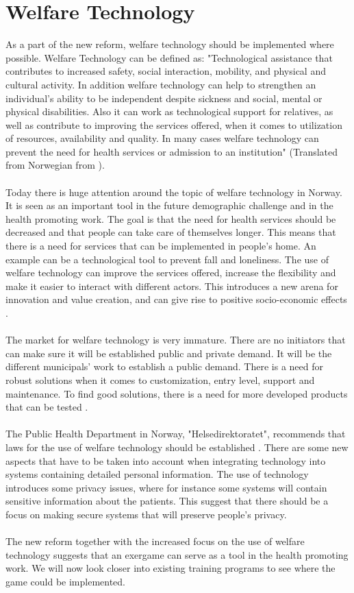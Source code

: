 \section{Welfare Technology}
As a part of the new reform, welfare technology should be implemented where possible. Welfare Technology can be defined as: "Technological assistance that contributes to increased safety, social interaction, mobility, and physical and cultural activity. In addition welfare technology can help to strengthen an individual's ability to be independent despite sickness and social, mental or physical disabilities. Also it can work as technological support for relatives, as well as contribute to improving the services offered, when it comes to utilization of resources, availability and quality. In many cases welfare technology can prevent the need for health services or admission to an institution" (Translated from Norwegian from \cite{welfare}).\\ \\
Today there is huge attention around the topic of welfare technology in Norway. It is seen as an important tool in the future demographic challenge and in the health promoting work.  The goal is that the need for health services should be decreased and that people can take care of themselves longer. This means that there is a need for services that can be implemented in people's home. An example can be a technological tool to prevent fall and loneliness.  The use of welfare technology can improve the services offered, increase the flexibility and make it easier to interact with different actors. This introduces a new arena for innovation and value creation, and can give rise to positive socio-economic effects \cite{welfare}. \\ \\
The market for welfare technology is very immature. There are no initiators that can make sure it will be established public and private demand. It will be the different municipals' work to establish a public demand. There is a need for robust solutions when it comes to customization, entry level, support and maintenance. To find good solutions, there is a need for more developed products that can be tested \cite{welfare}. \\ \\
The Public Health Department in Norway, "Helsedirektoratet", recommends that laws for the use of welfare technology should be established \cite{welfare}. There are some new aspects that have to be taken into account when integrating technology into systems containing detailed personal information. The use of technology introduces some privacy issues, where for instance some systems will contain  sensitive information about the patients. This suggest that there should be a focus on making secure systems that will preserve people’s privacy. \\ \\
The new reform together with the increased focus on the use of welfare technology suggests that an exergame can serve as a tool in the health promoting work. We will now look closer into existing training programs to see where the game could be implemented.

